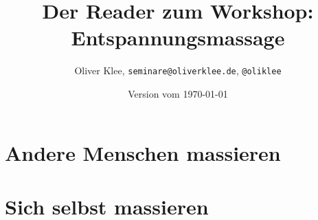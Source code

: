 \documentclass[a4paper,twoside,11pt,titlepage,openany]{scrbook}
\author{Oliver Klee, \texttt{seminare@oliverklee.de}, \texttt{@oliklee}}
\title{Der Reader zum Workshop: Entspannungsmassage}
\date{Version vom \today}
\begin{document}
\nocite*{}

\maketitle
\frontmatter




\tableofcontents

\mainmatter



\chapter{Andere Menschen massieren}






\chapter{Sich selbst massieren}


\backmatter

\end{document}
